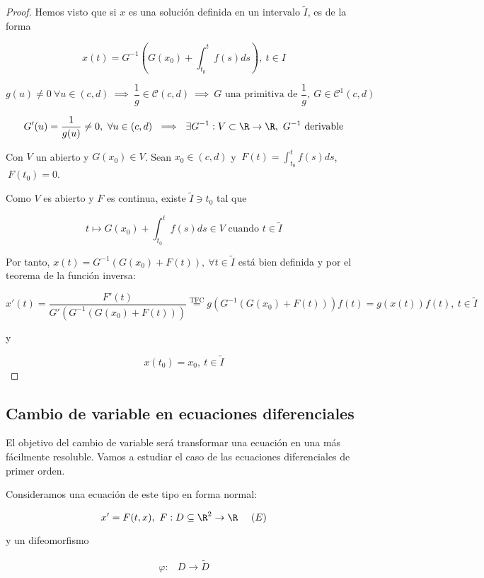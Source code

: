 

\begin{proof}

Hemos visto que si $x$ es una solución definida en un intervalo $\tilde{I}$, es de la forma

\[
x(t) = G^{-1}\left(G(x_0) + \int_{t_0}^t f(s)ds\right),\ t\in I
\]  
  
\[g(u) \neq 0 \ \forall u \in (c,d) \ \implies \ \frac{1}{g} \in \mathscr{C}(c,d) \ \implies \ G \text{ una primitiva de } \frac{1}{g}, \ G\in \mathscr{C}^{1}(c,d)\]

\[G'(u) = \frac{1}{g(u)} \neq 0, \ \forall u \in (c,d) \ \implies \ \exists G^{-1}:V\subset \R \to \R, \ G^{-1} \text{ derivable}\]

Con $V$ un abierto y $G(x_0) \in V$.
Sean $x_0 \in (c,d)$ y $\ F(t) = \displaystyle\int_{t_0}^t f(s) ds$, $\ F(t_0) = 0$.

Como $V$ es abierto y $F$ es continua, existe $\tilde{I} \ni t_0$ tal que

\[t \mapsto G(x_0)+\int_{t_0}^t f(s) ds  \in V \text{ cuando } t\in \tilde{I}\]

Por tanto, $x(t) = G^{-1}\left(G(x_0) + F(t)\right), \ \forall t \in \tilde{I}$ está bien definida y por el teorema de la función inversa:

\[x'(t) = \frac{F'(t)}{G'(G^{-1}(G(x_0) + F(t)))} \stackrel{\text{TFC}}{=} g\left(G^{-1}\left(G(x_0) + F(t)\right)\right)f(t) = g(x(t))f(t),\ t\in \tilde{I}\]

y

\[x(t_0) = x_0,\ t\in \tilde{I}\]


\end{proof}

  
\subsection{Cambio de variable en ecuaciones diferenciales}
El objetivo del cambio de variable será transformar una ecuación en una más fácilmente resoluble.
Vamos a estudiar el caso de las ecuaciones diferenciales de primer orden.


Consideramos una ecuación de este tipo en forma normal:

\[
  x' = F(t, x),\ F : D \subseteq \R^2 \to \R \ \ \ \ (E)
  \]

  y un difeomorfismo

  \[
  \begin{array}{lll}
    \varphi : & D \to \tilde{D} \\ 
  \end{array}
  \]

